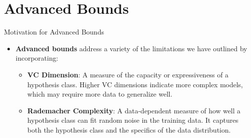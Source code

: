 \documentclass[
  ignorenonframetext,
]{beamer}
\providecommand{\tightlist}{%
  \setlength{\itemsep}{0pt}\setlength{\parskip}{0pt}}\usepackage{longtable,booktabs,array}
\begin{document}
\section{Advanced Bounds}\label{advanced-bounds}

\begin{frame}{Motivation for Advanced Bounds}
\label{motivation-for-advanced-bounds}
\begin{itemize}
\tightlist
\item
  \textbf{Advanced bounds} address a variety of the limitations we have
  outlined by incorporating:

  \begin{itemize}
  \tightlist
  \item
    \textbf{VC Dimension}: A measure of the capacity or expressiveness
    of a hypothesis class. Higher VC dimensions indicate more complex
    models, which may require more data to generalize well.
  \item
    \textbf{Rademacher Complexity}: A data-dependent measure of how well
    a hypothesis class can fit random noise in the training data. It
    captures both the hypothesis class and the specifics of the data
    distribution.
  \end{itemize}
\end{itemize}
\end{frame}
\end{document}
